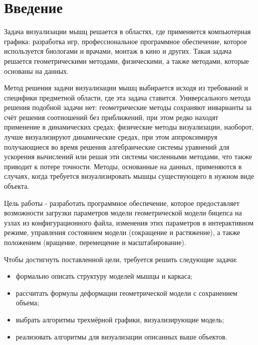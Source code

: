 \chapter*{Введение}

Задача визуализации мышц решается в областях, где применяется компьютерная графика: разработка игр, профессиональное программное обеспечение, которое используется биологами и врачами, монтаж в кино и других. Такая задача решается геометрическими методами, физическими, а также методами, которые основаны на данных\cite{cgv}.

Метод решения задачи визуализации мышц выбирается исходя из требований и специфики предметной области, где эта задача ставится. Универсального метода решения подобной задачи нет: геометрические методы сохраняют инварианты за счёт решения соотношений без приближений, при этом редко находят применение в динамических средах; физические методы визуализации, наоборот, лучше визуализируют динамические средах, при этом аппроксимируя получающиеся во время решения алгебраические системы уравнений для ускорения вычислений или решая эти системы численными методами, что также приводит к потере точности. Методы, основанные на данных, применяются в случаях, когда требуется визуализировать мышцы существующего в нужном виде объекта.

Цель работы - разработать программное обеспечение, которое предоставляет возможности загрузки параметров модели геометрической модели бицепса на узлах из конфигурационного файла, изменения этих параметров в интерактивном режиме, управления состоянием модели (сокращение и растяжение), а также положением (вращение, перемещение и масштабирование).

Чтобы достигнуть поставленной цели, требуется решить следующие задачи:
\begin{itemize}
    \item формально описать структуру моделей мышцы и каркаса;
    \item рассчитать формулы деформации геометрической модели с сохранением объема;
    \item выбрать алгоритмы трехмёрной графики, визуализирующие модель;
    \item реализовать алгоритмы для визуализации описанных выше объектов.
\end{itemize}
